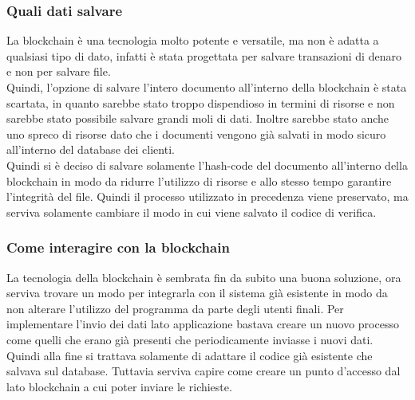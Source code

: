 \subsubsection{Quali dati salvare}
La blockchain è una tecnologia molto potente e versatile, ma non è adatta a
qualsiasi tipo di dato, infatti è stata progettata per salvare transazioni
di denaro e non per salvare file. \\
Quindi, l'opzione di salvare l'intero documento all'interno della blockchain
è stata scartata, in quanto sarebbe stato troppo dispendioso in termini di
risorse e non sarebbe stato possibile salvare grandi moli di dati. Inoltre 
sarebbe stato anche uno spreco di risorse dato che i documenti vengono già
salvati in modo sicuro all'interno del database dei clienti. \\
Quindi si è deciso di salvare solamente l'hash-code del documento all'interno
della blockchain in modo da ridurre l'utilizzo di risorse e allo stesso tempo
garantire l'integrità del file.
Quindi il processo utilizzato in precedenza viene preservato, ma serviva 
solamente cambiare il modo in cui viene salvato il codice di verifica.

\subsubsection{Come interagire con la blockchain}
La tecnologia della blockchain è sembrata fin da subito una buona soluzione, 
ora serviva trovare un modo per integrarla con il sistema già esistente in 
modo da non alterare l'utilizzo del programma da parte degli utenti finali.
Per implementare l'invio dei dati lato applicazione bastava creare un nuovo
processo come quelli che erano già presenti che periodicamente inviasse i 
nuovi dati. Quindi alla fine si trattava solamente di adattare il codice 
già esistente che salvava sul database.
Tuttavia serviva capire come creare un punto d'accesso dal lato blockchain
a cui poter inviare le richieste.

